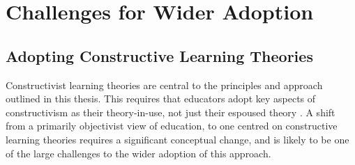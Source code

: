 












\section{Challenges for Wider Adoption} %
\label{sec:challenges_for_wider_adoption}

\subsection{Adopting Constructive Learning Theories} %
\label{sub:adopting_constructive_learning_theories}

Constructivist learning theories are central to the principles and approach outlined in this thesis. This requires that educators adopt key aspects of constructivism as their theory-in-use, not just their espoused theory \cite{Argyris:1976}. A shift from a primarily objectivist view of education, to one centred on constructive learning theories requires a significant conceptual change, and is likely to be one of the large challenges to the wider adoption of this approach.  

